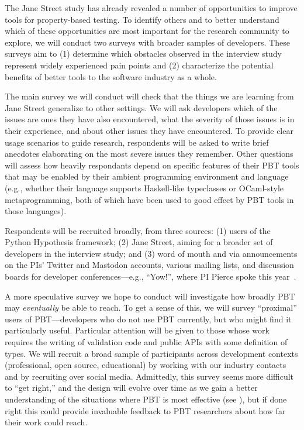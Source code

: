 %
The Jane Street study has already revealed a number of
opportunities to improve tools for property-based testing. To identify
others and to better understand which of these opportunities are most
important for the research community to explore, we will conduct two
surveys with broader samples of developers. These surveys aim to
(1) determine which obstacles observed in the interview study
represent widely experienced pain points and
(2) characterize the potential benefits of better tools to the
software industry as a whole.

The main survey we will conduct
will check that
the things we are learning from Jane Street generalize to other settings.
We will
ask developers which of the issues are
ones they have also encountered, what the severity of those issues is
in their experience, and about
other issues they have encountered.
To provide
clear usage scenarios to guide research, respondents will
be asked to write brief anecdotes elaborating on the
most severe issues they remember.  Other questions will assess how
heavily respondants depend on specific features of their PBT tools
that may be enabled by their
ambient programming environment and language (e.g., whether their
language supports Haskell-like typeclasses or OCaml-style
metaprogramming, both of which have been used to good effect by
PBT tools in those languages).

Respondents will
be recruited broadly, from three sources: (1)
users of the Python Hypothesis framework; (2) Jane Street, aiming for
a broader set of developers in the interview study; and (3)
word of mouth and via announcements on the PIs' Twitter and Mastodon
accounts, various mailing lists, and discussion boards for developer
conferences---e.g., ``Yow!'', where PI Pierce spoke this
year~\cite{Pierce:Yow22}.

A more speculative survey we hope to
conduct
will investigate
how broadly PBT may {\em eventually} be able to reach.  To get a sense
of this, we will
survey ``proximal'' users of PBT---developers who do not use PBT
currently, but who might find it particularly
useful.  Particular attention will be given to those whose work requires the
writing of validation code and public APIs with some definition of types. We
will recruit a broad sample of participants across development contexts
(professional, open source, educational) by working with our industry contacts
and by recruiting over social media. Admittedly, this survey seems more
difficult to ``get right,'' and the design will evolve over time as we gain a
better understanding of the situations where PBT is most effective
(see ), but if done right this could provide invaluable
feedback to PBT researchers about how far their work could reach.

